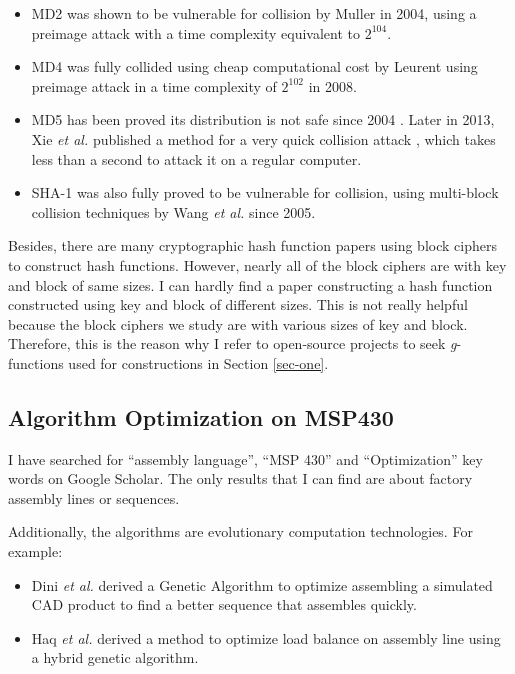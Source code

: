 \documentclass[sigconf, review=false]{acmart}
\let\OldTexttrademark\texttrademark
\renewcommand{\texttrademark}{\OldTexttrademark\xspace}%
\begin{document}
\begin{itemize}
    \item MD2 was shown to be vulnerable for collision by Muller in 2004,
          using a preimage attack with a time complexity equivalent to $2^{104}$. \cite{muller2004md2}
    \item MD4 was fully collided using cheap computational cost by Leurent
          using preimage attack in a time complexity of $2^{102}$ in 2008. \cite{leurent2008md4}
    \item MD5 has been proved its distribution is not safe since 2004 \cite{hawkes2004musings}.
          Later in 2013, Xie \textit{et al.} published a method for a very quick collision attack \cite{xie2013fast},
          which takes less than a second to attack it on a regular computer.
    \item SHA-1 was also fully proved to be vulnerable for collision, using multi-block collision techniques
          by Wang \textit{et al.} since 2005. \cite{wang2005finding}
\end{itemize}

Besides, there are many cryptographic hash function papers using block ciphers to construct hash functions.
However, nearly all of the block ciphers are with key and block of same sizes.
I can hardly find a paper constructing a hash function constructed using key and block of different sizes.
This is not really helpful because the block ciphers we study are with various sizes of key and block.
Therefore, this is the reason why I refer to open-source projects to seek \textit{g}-functions used for constructions
in Section \ref{sec-one}.

\subsection{Algorithm Optimization on MSP430}
I have searched for ``assembly language'', ``MSP 430'' and ``Optimization'' key words on Google\texttrademark Scholar.
The only results that I can find are about factory assembly lines or sequences.

Additionally, the algorithms are evolutionary computation technologies. For example:

\begin{itemize}
    \item Dini \textit{et al.} derived a Genetic Algorithm to optimize assembling a simulated CAD product
          to find a better sequence that assembles quickly. \cite{dini1999generation}
    \item Haq \textit{et al.} derived a method to optimize load balance on assembly line
          using a hybrid genetic algorithm. \cite{haq2006hybrid}
\end{itemize}
\end{document}

